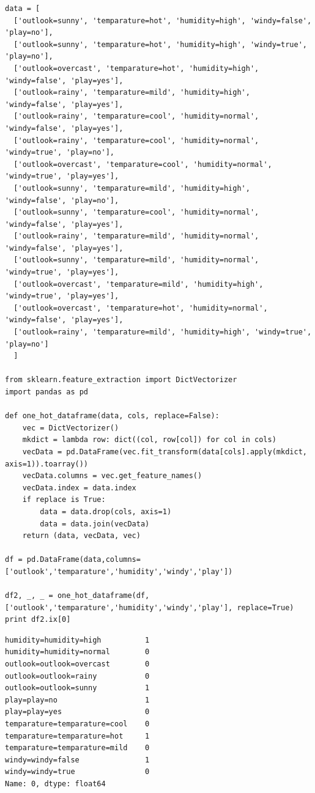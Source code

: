 \documentclass[12pt,fleqn]{article}\usepackage{../common}
\begin{document}
\begin{verbatim}
data = [
  ['outlook=sunny', 'temparature=hot', 'humidity=high', 'windy=false', 'play=no'],
  ['outlook=sunny', 'temparature=hot', 'humidity=high', 'windy=true', 'play=no'],
  ['outlook=overcast', 'temparature=hot', 'humidity=high', 'windy=false', 'play=yes'],
  ['outlook=rainy', 'temparature=mild', 'humidity=high', 'windy=false', 'play=yes'],
  ['outlook=rainy', 'temparature=cool', 'humidity=normal', 'windy=false', 'play=yes'],
  ['outlook=rainy', 'temparature=cool', 'humidity=normal', 'windy=true', 'play=no'],
  ['outlook=overcast', 'temparature=cool', 'humidity=normal', 'windy=true', 'play=yes'],
  ['outlook=sunny', 'temparature=mild', 'humidity=high', 'windy=false', 'play=no'],
  ['outlook=sunny', 'temparature=cool', 'humidity=normal', 'windy=false', 'play=yes'],
  ['outlook=rainy', 'temparature=mild', 'humidity=normal', 'windy=false', 'play=yes'],
  ['outlook=sunny', 'temparature=mild', 'humidity=normal', 'windy=true', 'play=yes'],
  ['outlook=overcast', 'temparature=mild', 'humidity=high', 'windy=true', 'play=yes'],
  ['outlook=overcast', 'temparature=hot', 'humidity=normal', 'windy=false', 'play=yes'],
  ['outlook=rainy', 'temparature=mild', 'humidity=high', 'windy=true', 'play=no']
  ]

from sklearn.feature_extraction import DictVectorizer
import pandas as pd

def one_hot_dataframe(data, cols, replace=False):
    vec = DictVectorizer()
    mkdict = lambda row: dict((col, row[col]) for col in cols)
    vecData = pd.DataFrame(vec.fit_transform(data[cols].apply(mkdict, axis=1)).toarray())
    vecData.columns = vec.get_feature_names()
    vecData.index = data.index
    if replace is True:
        data = data.drop(cols, axis=1)
        data = data.join(vecData)
    return (data, vecData, vec)

df = pd.DataFrame(data,columns=['outlook','temparature','humidity','windy','play'])

df2, _, _ = one_hot_dataframe(df, ['outlook','temparature','humidity','windy','play'], replace=True)
print df2.ix[0]
\end{verbatim}

\begin{verbatim}
humidity=humidity=high          1
humidity=humidity=normal        0
outlook=outlook=overcast        0
outlook=outlook=rainy           0
outlook=outlook=sunny           1
play=play=no                    1
play=play=yes                   0
temparature=temparature=cool    0
temparature=temparature=hot     1
temparature=temparature=mild    0
windy=windy=false               1
windy=windy=true                0
Name: 0, dtype: float64
\end{verbatim}
\end{document}
